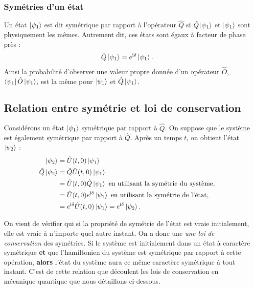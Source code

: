 \subsubsection{Symétries d'un état}
Un état $\ket{\psi_1}$ est dit symétrique par rapport à l'opérateur $\hat{Q}$ si $\hat{Q}\ket{\psi_1}$ et $\ket{\psi_1}$ sont physiquement les mêmes. Autrement dit, ces états sont égaux à facteur de phase près :
\begin{equation}
\hat{Q}\ket{\psi_1} = e^{\mathrm{i}\delta}\ket{\psi_1}.
\end{equation}
Ainsi la probabilité d'observer une valeur propre donnée d'un opérateur $\hat{O}$, $\bra{\psi_1}\hat{O}\ket{\psi_1}$, est la même pour $\ket{\psi_1}$ et $\hat{Q}\ket{\psi_1}$.
\subsection{Relation entre symétrie et loi de conservation}
Considérons un état $\ket{\psi_1}$ symétrique par rapport à $\hat{Q}$. On suppose que le système est également symétrique par rapport à $\hat{Q}$. Après un temps $t$, on obtient l'état $\ket{\psi_2}$ :
\begin{align}
\ket{\psi_2}&=\hat{U}(t,0)\ket{\psi_1}\nonumber\\
\hat{Q}\ket{\psi_2}&=\hat{Q}\hat{U}(t,0)\ket{\psi_1}\nonumber\\
&=\hat{U}(t,0)\hat{Q}\ket{\psi_1} \mbox{ en utilisant la symétrie du système,}\nonumber\\
&=\hat{U}(t,0)e^{\mathrm{i}\delta}\ket{\psi_1} \mbox{ en utilisant la symétrie de l'état,}\nonumber\\
&=e^{\mathrm{i}\delta}\hat{U}(t,0)\ket{\psi_1}=e^{\mathrm{i}\delta}\ket{\psi_2}.
\end{align}

On vient de vérifier qui si la propriété de symétrie de l'état est vraie initialement, elle est vraie à n'importe quel autre instant. On a donc une \textit{une loi de conservation} des symétries. Si le système est initialement dans un état à caractère symétrique \textbf{et} que l'hamiltonien du système est symétrique par rapport à cette opération, \textbf{alors} l'état du système aura ce même caractère symétrique à tout instant. C'est de cette relation que découlent les lois de conservation en mécanique quantique que nous détaillons ci-dessous.

